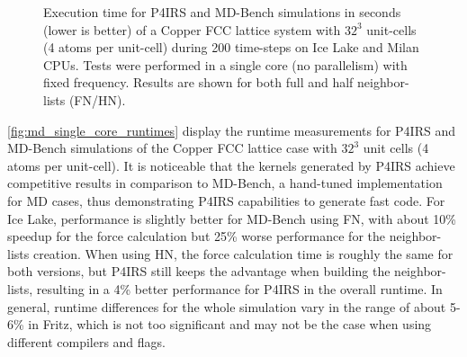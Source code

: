 \documentclass[preprint,12pt]{elsarticle}
\begin{document}
\begin{figure}[t]
\vspace{-3ex}
	\caption{Execution time for P4IRS and MD-Bench simulations in seconds (lower is better) of a Copper FCC lattice system with $32^{3}$ unit-cells (4 atoms per unit-cell) during 200 time-steps on Ice Lake and Milan CPUs. Tests were performed in a single core (no parallelism) with fixed frequency. Results are shown for both full and half neighbor-lists (FN/HN).}
\vspace{-2ex}
\centering
\label{fig:md_single_core_runtimes}
\end{figure}

\autoref{fig:md_single_core_runtimes} display the runtime measurements for P4IRS and MD-Bench simulations of the Copper FCC lattice case with $32^{3}$ unit cells (4 atoms per unit-cell).
It is noticeable that the kernels generated by P4IRS achieve competitive results in comparison to MD-Bench, a hand-tuned implementation for MD cases, thus demonstrating P4IRS capabilities to generate fast code.
For Ice Lake, performance is slightly better for MD-Bench using \ac{FN}, with about 10\% speedup for the force calculation but 25\% worse performance for the neighbor-lists creation.
When using \ac{HN}, the force calculation time is roughly the same for both versions, but P4IRS still keeps the advantage when building the neighbor-lists, resulting in a 4\% better performance for P4IRS in the overall runtime.
In general, runtime differences for the whole simulation vary in the range of about 5-6\% in Fritz, which is not too significant and may not be the case when using different compilers and flags.
\end{document}
